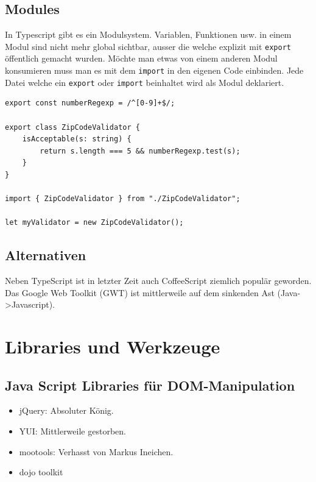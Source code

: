 \subsection{Modules}

In Typescript gibt es ein Modulsystem. Variablen, Funktionen usw. in einem Modul sind nicht mehr global sichtbar, ausser die welche explizit mit \lstinline|export| öffentlich gemacht wurden. Möchte man etwas von einem anderen Modul konsumieren muss man es mit dem \lstinline|import| in den eigenen Code einbinden. Jede Datei welche ein \lstinline|export| oder \lstinline|import| beinhaltet wird als Modul deklariert. 

\begin{lstlisting}[label=lst:typescript-modules,caption=Modules]
export const numberRegexp = /^[0-9]+$/;

export class ZipCodeValidator {
	isAcceptable(s: string) {
		return s.length === 5 && numberRegexp.test(s);
	}
}

import { ZipCodeValidator } from "./ZipCodeValidator";

let myValidator = new ZipCodeValidator();
\end{lstlisting}

\subsection{Alternativen}
Neben TypeScript ist in letzter Zeit auch CoffeeScript ziemlich populär geworden. Das Google Web Toolkit (GWT) ist mittlerweile auf dem sinkenden Ast (Java->Javascript).

\section{Libraries und Werkzeuge}

\subsection{Java Script Libraries für DOM-Manipulation}
\begin{itemize}
	\item jQuery: Absoluter König.
	\item YUI: Mittlerweile gestorben.
	\item mootools: Verhasst von Markus Ineichen.
	\item dojo toolkit
\end{itemize}

